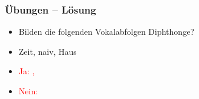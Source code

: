 
\begin{frame}
\frametitle{Übungen -- Lösung}

\begin{itemize}
	\item Bilden die folgenden Vokalabfolgen Diphthonge?
	\item[] Zeit, naiv, Haus
	
	\item \textcolor{red}{Ja:  , \textipa{[h\texttoptiebar{aU}s]}}
	\item \textcolor{red}{Nein: \textipa{[na.Pi:f]}}
\end{itemize}

\end{frame}
